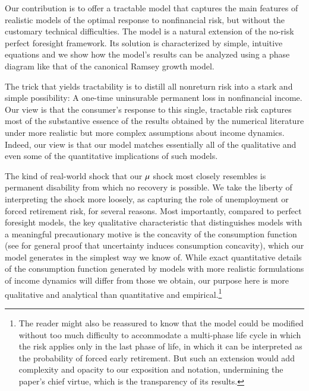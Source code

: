 \documentclass[titlepage,abstract]{\econtex}\newcommand{\texname}{ctDiscrete}
\begin{document}
Our contribution is to offer a tractable model that captures the main
features of realistic models of the optimal response to nonfinancial
risk, but without the customary technical difficulties. The model is a
natural extension of the no-risk perfect foresight framework. Its
solution is characterized by simple, intuitive equations and we show
how the model's results can be analyzed using a phase diagram like
that of the canonical Ramsey growth model.

The trick that yields tractability is to distill all nonreturn risk
into a stark and simple possibility: A one-time uninsurable permanent
loss in nonfinancial income.  Our view is that the consumer's response
to this single, tractable risk captures most of the substantive
essence of the results obtained by the numerical literature under more
realistic but more complex assumptions about income dynamics.  Indeed, our view is that our
model matches essentially all of the qualitative and even some of the
quantitative implications of such models.
 
The kind of real-world shock that our $\mu$ shock most closely
resembles is permanent disability from which no recovery is possible.
We take the liberty of interpreting the shock more loosely, as
capturing the role of unemployment or forced retirement risk, for
several reasons.  Most importantly, compared to perfect foresight
models, the key qualitative characteristic that distinguishes models
with a meaningful precautionary motive is the concavity of the
consumption function (see \cite{carroll&kimball:concavity} for general
proof that uncertainty induces consumption concavity), which our
model generates in the simplest way we know of.  While exact
quantitative details of the consumption function generated by models
with more realistic formulations of income dynamics will differ from
those we obtain, our purpose here is more qualitative and analytical
than quantitative and empirical.\footnote{The reader might also be reassured
to know that the model could be modified without too much difficulty
to accommodate a multi-phase life cycle in which the risk applies only
in the last phase of life, in which it can be interpreted as the
probability of forced early retirement.  But such an extension would
add complexity and opacity to our exposition and notation, undermining
the paper's chief virtue, which is the transparency of its results.}
\end{document}
